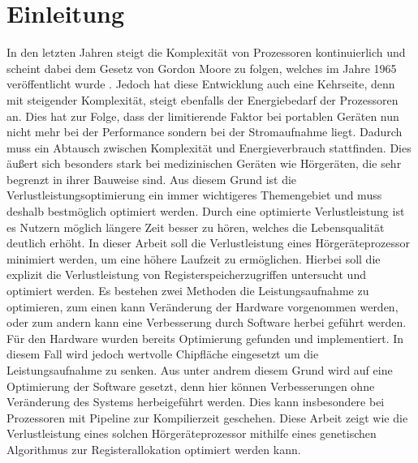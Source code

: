 
\thispagestyle{empty}
%
\chapter{Einleitung}
\label{chap:introduction}
In den letzten Jahren steigt die Komplexität von Prozessoren kontinuierlich und scheint dabei dem Gesetz von Gordon Moore zu folgen, welches im Jahre 1965 veröffentlicht wurde \cite{moore1965moore}. Jedoch hat diese Entwicklung auch eine Kehrseite, denn mit steigender Komplexität, steigt ebenfalls der Energiebedarf der Prozessoren an. Dies hat zur Folge, dass der limitierende Faktor bei portablen Geräten nun nicht mehr bei der Performance sondern bei der Stromaufnahme liegt. Dadurch muss ein Abtausch zwischen Komplexität und Energieverbrauch stattfinden. Dies äußert sich besonders stark bei medizinischen Geräten wie Hörgeräten, die sehr begrenzt in ihrer Bauweise sind. Aus diesem Grund ist die Verlustleistungsoptimierung ein immer wichtigeres Themengebiet und muss deshalb bestmöglich optimiert werden. Durch eine optimierte Verlustleistung ist es Nutzern möglich längere Zeit besser zu hören, welches die Lebensqualität deutlich erhöht.
In dieser Arbeit soll die Verlustleistung eines Hörgeräteprozessor minimiert werden, um eine höhere Laufzeit zu ermöglichen. Hierbei soll die explizit die Verlustleistung von Registerspeicherzugriffen untersucht und optimiert werden. 
Es bestehen zwei Methoden die Leistungsaufnahme zu optimieren, zum einen kann Veränderung der Hardware vorgenommen werden, oder zum andern kann eine Verbesserung durch Software herbei geführt werden. Für den  Hardware wurden bereits Optimierung gefunden und implementiert. In diesem Fall wird jedoch wertvolle Chipfläche eingesetzt um die Leistungsaufnahme zu senken. Aus unter andrem diesem Grund wird auf eine Optimierung der Software gesetzt, denn hier können Verbesserungen ohne Veränderung des Systems herbeigeführt werden. Dies kann insbesondere bei Prozessoren mit Pipeline zur Kompilierzeit geschehen. 
Diese Arbeit zeigt wie die Verlustleistung eines solchen Hörgeräteprozessor mithilfe eines genetischen Algorithmus zur Registerallokation optimiert werden kann.



